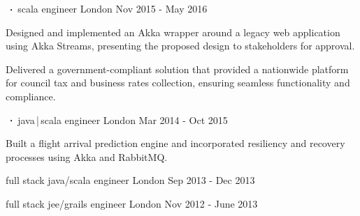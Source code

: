 \begin{cventries}
    \cventry
    {     }
    {$\sqbig$scala engineer}
    {London}
    {Nov 2015 - May 2016}
    {}
    {
        \begin{cvitems}
            \item{Designed and implemented an Akka wrapper around a legacy web application using Akka Streams, presenting the proposed design to stakeholders for approval.}
            \item{Delivered a government-compliant solution that provided a nationwide platform for council tax and business rates collection, ensuring seamless functionality and compliance.}
        \end{cvitems}
    }

    \cventry
    {    }
    {$\sqbig$java\,|\,scala engineer}
    {London}
    {Mar 2014 - Oct 2015}
    {}
    {
        \begin{cvitems}
            \item{Built a flight arrival prediction engine and incorporated resiliency and recovery processes using Akka and RabbitMQ.}
        \end{cvitems}
    }

    \cventry
    {full stack java/scala engineer}
    {}
    {London}
    {Sep 2013 - Dec 2013}
    {}
    {}

    \cventry
    {full stack jee/grails engineer}
    {}
    {London}
    {Nov 2012 - June 2013}
    {}
    {}


\end{cventries}
